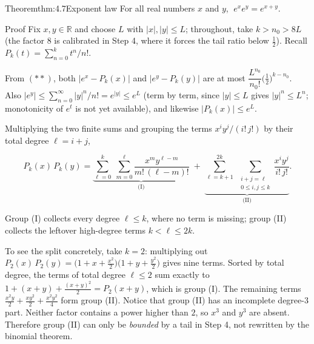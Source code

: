 \documentclass[a4paper,12pt,oneside]{memoir}
\begin{document}
\begin{envtheorem}{Theorem}{thm:4.7}{Exponent law}
For all real numbers \(x\) and \(y\), \(\; e^{x} e^{y} = e^{x + y}\).
\end{envtheorem}
\begin{envproof}{Proof}{}{}
Fix \(x, y \in \mathbb{R}\) and choose \(L\) with \(\lvert x \rvert, \lvert y \rvert \le L\); throughout, take \(k > n_{0} > 8L\) (the factor \(8\) is calibrated in Step 4, where it forces the tail ratio below \(\tfrac{1}{2}\)). Recall \(P_{k}(t) = \sum_{n=0}^{k} t^{n}/n!\).

From \((**)\), both \(\lvert e^{x} - P_{k}(x) \rvert\) and \(\lvert e^{y} - P_{k}(y) \rvert\) are at most \(\dfrac{L^{n_{0}}}{n_{0}!}\bigl(\tfrac{1}{2}\bigr)^{k - n_{0}}\). Also \(\lvert e^{y} \rvert \le \sum_{n=0}^{\infty} \lvert y \rvert^{n}/n! = e^{\lvert y \rvert} \le e^{L}\) (term by term, since \(\lvert y \rvert \le L\) gives \(\lvert y \rvert^{n} \le L^{n}\); monotonicity of \(e^{t}\) is not yet available), and likewise \(\lvert P_{k}(x) \rvert \le e^{L}\).

Multiplying the two finite sums and grouping the terms \(x^{i} y^{j}/(i!\,j!)\) by their total degree \(\ell = i + j\),

\[ P_{k}(x)\, P_{k}(y) = \underbrace{\sum_{\ell = 0}^{k} \; \sum_{m = 0}^{\ell} \frac{x^{m} y^{\ell - m}}{m!\,(\ell - m)!}}_{\text{(I)}} \; + \; \underbrace{\sum_{\ell = k + 1}^{2k} \; \sum_{\substack{i + j = \ell \\ 0 \le i, j \le k}} \frac{x^{i} y^{j}}{i!\, j!}}_{\text{(II)}}. \]

Group (I) collects every degree \(\ell \le k\), where no term is missing; group (II) collects the leftover high-degree terms \(k < \ell \le 2k\).

To see the split concretely, take \(k = 2\): multiplying out \(P_{2}(x)\,P_{2}(y) = \bigl(1 + x + \tfrac{x^{2}}{2}\bigr)\bigl(1 + y + \tfrac{y^{2}}{2}\bigr)\) gives nine terms. Sorted by total degree, the terms of total degree \(\ell \le 2\) sum exactly to \(1 + (x + y) + \tfrac{(x + y)^{2}}{2} = P_{2}(x + y)\), which is group (I). The remaining terms \(\tfrac{x^{2} y}{2} + \tfrac{x y^{2}}{2} + \tfrac{x^{2} y^{2}}{4}\) form group (II). Notice that group (II) has an incomplete degree-\(3\) part. Neither factor contains a power higher than \(2\), so \(x^{3}\) and \(y^{3}\) are absent. Therefore group (II) can only be \emph{bounded} by a tail in Step 4, not rewritten by the binomial theorem.


\end{envproof}
\end{document}
